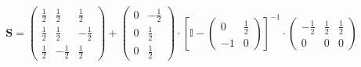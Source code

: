 \documentclass[10pt]{article} \usepackage{amsmath} \usepackage{bbold}
\begin{document}
\[ \mathbf{S} = \left(\begin{smallmatrix} \frac{1}{2} & \frac{1}{2} &
\frac{1}{2} \\ \frac{1}{2} & \frac{1}{2} & -\frac{1}{2} \\ \frac{1}{2}
& -\frac{1}{2} & \frac{1}{2} \end{smallmatrix}\right) +
\left(\begin{smallmatrix} 0 & -\frac{1}{2} \\ 0 & \frac{1}{2} \\ 0 &
\frac{1}{2} \end{smallmatrix}\right) \cdot \left[ \mathbb{I}  -
\left(\begin{smallmatrix} 0 & \frac{1}{2} \\ -1 & 0
\end{smallmatrix}\right) \right]^{-1} \cdot\left(\begin{smallmatrix}
-\frac{1}{2} & \frac{1}{2} & \frac{1}{2} \\ 0 & 0 & 0
\end{smallmatrix}\right) \]
\end{document}
